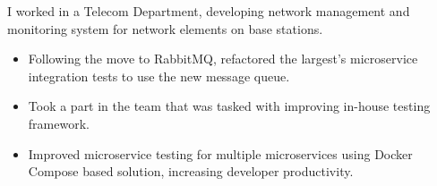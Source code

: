 I worked in a Telecom Department, developing network management and monitoring system for network elements on base stations. 

\begin{itemize}
    \item Following the move to RabbitMQ, refactored the largest's microservice integration 
        tests to use the new message queue. 
    \item Took a part in the team that was tasked with improving in-house testing framework.
    \item Improved microservice testing for multiple microservices using Docker Compose based solution,
        increasing developer productivity.  
\end{itemize}
